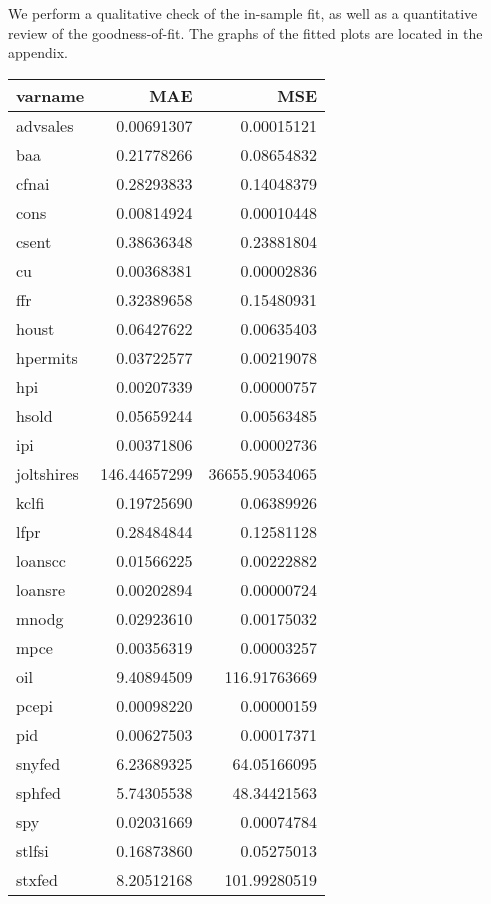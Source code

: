 \documentclass[11pt, letterpaper]{article}\usepackage[]{graphicx}\usepackage[]{color}
\begin{document}
We perform a qualitative check of the in-sample fit, as well as a quantitative review of the goodness-of-fit. The graphs of the fitted plots are located in the appendix.
\begin{table}[H]
\centering
\begingroup\footnotesize
\begin{tabular}{lrr}
  \hline
varname & MAE & MSE \\ 
  \hline
advsales & 0.00691307 & 0.00015121 \\ 
  baa & 0.21778266 & 0.08654832 \\ 
  cfnai & 0.28293833 & 0.14048379 \\ 
  cons & 0.00814924 & 0.00010448 \\ 
  csent & 0.38636348 & 0.23881804 \\ 
  cu & 0.00368381 & 0.00002836 \\ 
  ffr & 0.32389658 & 0.15480931 \\ 
  houst & 0.06427622 & 0.00635403 \\ 
  hpermits & 0.03722577 & 0.00219078 \\ 
  hpi & 0.00207339 & 0.00000757 \\ 
  hsold & 0.05659244 & 0.00563485 \\ 
  ipi & 0.00371806 & 0.00002736 \\ 
  joltshires & 146.44657299 & 36655.90534065 \\ 
  kclfi & 0.19725690 & 0.06389926 \\ 
  lfpr & 0.28484844 & 0.12581128 \\ 
  loanscc & 0.01566225 & 0.00222882 \\ 
  loansre & 0.00202894 & 0.00000724 \\ 
  mnodg & 0.02923610 & 0.00175032 \\ 
  mpce & 0.00356319 & 0.00003257 \\ 
  oil & 9.40894509 & 116.91763669 \\ 
  pcepi & 0.00098220 & 0.00000159 \\ 
  pid & 0.00627503 & 0.00017371 \\ 
  snyfed & 6.23689325 & 64.05166095 \\ 
  sphfed & 5.74305538 & 48.34421563 \\ 
  spy & 0.02031669 & 0.00074784 \\ 
  stlfsi & 0.16873860 & 0.05275013 \\ 
  stxfed & 8.20512168 & 101.99280519 \\ 

\end{tabular}
\end{table}
\end{document}

